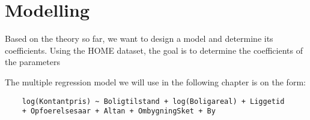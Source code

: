 \section{Modelling} \label{sec:modelling}

Based on the theory so far, we want to design a model and determine its coefficients. 
Using the HOME dataset, the goal is to determine the coefficients of the parameters

The multiple regression model we will use in the following chapter is on the form:
\begin{lstlisting}
    log(Kontantpris) ~ Boligtilstand + log(Boligareal) + Liggetid
    + Opfoerelsesaar + Altan + OmbygningSket + By
\end{lstlisting}